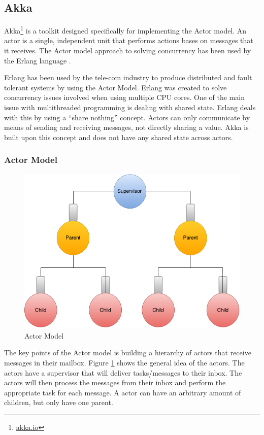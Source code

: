 \subsection{Akka} 
Akka\footnote{\href{akka.io}{akka.io}}\cite{akka-documentation} is a toolkit designed specifically for implementing the Actor model. An actor is a single, independent unit that performs actions bases on messages that it receives. The Actor model approach to solving concurrency has been used by the Erlang language \cite{vinoski2007concurrency}. 

Erlang has been used by the tele-com industry to produce distributed and fault tolerant systems by using the Actor Model. Erlang was created to solve concurrency issues involved when using multiple CPU cores. One of the main issue with multithreaded programming is dealing with shared state. Erlang deals with this by using a ``share nothing'' concept. Actors can only communicate by means of sending and receiving messages, not directly sharing a value. Akka is built upon this concept and does not have any shared state across actors.

\subsubsection{Actor Model}
\begin{figure}[h]
	\centering
	\includegraphics[scale=0.4]{images/tools/ActorModel.png} 
	\caption{Actor Model}
	\label{fig:ActorModel}
\end{figure}
The key points of the Actor model is building a hierarchy of  actors that receive messages in their mailbox. Figure \ref{fig:ActorModel} shows the general idea of the actors. The actors have a supervisor that will deliver tasks/messages to their inbox. The actors will then process the messages from their inbox and perform the appropriate task for each message. A actor can have an arbitrary amount of children, but only have one parent.
